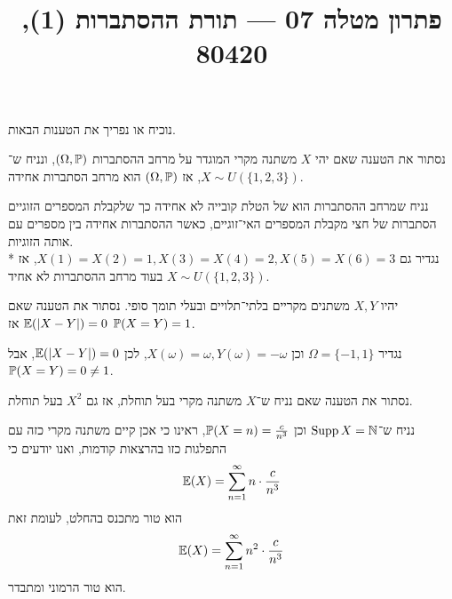 
\title{פתרון מטלה 07 --- תורת ההסתברות (1), 80420}

\DeclareMathOperator{\Supp}{Supp}


\maketitle
\maketitleprint{}

\question{}
נוכיח או נפריך את הטענות הבאות.

\subquestion{}
נסתור את הטענה שאם יהי $X$ משתנה מקרי המוגדר על מרחב ההסתברות $(\Omega, \mathbb{P})$, ונניח ש־$X \sim U(\{1, 2, 3\})$, אז $(\Omega, \mathbb{P})$ הוא מרחב הסתברות אחידה.
\begin{solution}
	נניח שמרחב ההסתברות הוא של הטלת קובייה לא אחידה כך שלקבלת המספרים הזוגיים הסתברות של חצי מקבלת המספרים האי־זוגיים, כאשר ההסתברות אחידה בין מספרים עם אותה הזוגיות. \\*
	נגדיר גם $X(1) = X(2) = 1, X(3) = X(4) = 2, X(5) = X(6) = 3$, אז $X \sim U(\{1, 2, 3\})$ בעוד מרחב ההסתברות לא אחיד.
\end{solution}

\subquestion{}
יהיו $X, Y$ משתנים מקריים בלתי־תלויים ובעלי תומך סופי.
נסתור את הטענה שאם $\mathbb{E}(|X - Y|) = 0$ אז $\mathbb{P}(X = Y) = 1$.
\begin{solution}
	נגדיר $\Omega = \{-1, 1\}$ וכן $X(\omega) = \omega, Y(\omega) = -\omega$, לכן $\mathbb{E}(|X - Y|) = 0$, אבל $\mathbb{P}(X = Y) = 0 \ne 1$.
\end{solution}

\subquestion{}
נסתור את הטענה שאם נניח ש־$X$ משתנה מקרי בעל תוחלת, אז גם $X^2$ בעל תוחלת.
\begin{solution}
	נניח ש־$\Supp X = \NN$ וכן $\mathbb{P}(X = n) = \frac{c}{n^3}$, ראינו כי אכן קיים משתנה מקרי כזה עם התפלגות כזו בהרצאות קודמות, ואנו יודעים כי
	\[
		\mathbb{E}(X) = \sum_{n = 1}^{\infty} n \cdot \frac{c}{n^3}
	\]
	הוא טור מתכנס בהחלט, לעומת זאת
	\[
		\mathbb{E}(X) = \sum_{n = 1}^{\infty} n^2 \cdot \frac{c}{n^3}
	\]
	הוא טור הרמוני ומתבדר.
\end{solution}


